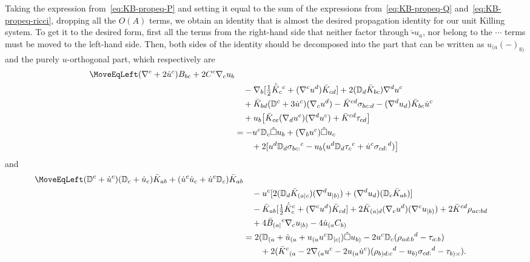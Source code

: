 \documentclass[a4paper]{article}
\theoremstyle{remark}
\newcommand{\D}{\mathbb{D}}
\begin{document}
Taking the expression from~\eqref{eq:KB-propeq-P} and setting it equal
to the sum of the expressions from~\eqref{eq:KB-propeq-Q}
and~\eqref{eq:KB-propeq-ricci}, dropping all the $O(A)$ terms, we obtain
an identity that is almost the desired propagation identity for our unit
Killing system. To get it to the desired form, first all the terms from
the right-hand side that neither factor through $\hat{\square} u_a$, nor
belong to the $\cdots$ terms must be moved to the left-hand side. Then,
both sides of the identity should be decomposed into the part that can
be written as $u_{(a} (-)_{b)}$ and the purely
$u$-orthogonal part, which respectively are
\begin{align}
	\notag
	\MoveEqLeft
	(\nabla^c + 2 \dot{u}^c) B_{bc}
		+ 2 C^c \nabla_c u_{b}
	\\ \notag & \quad {}
		- \nabla_{b} [\tfrac{1}{2} \dot{\bar{K}}_c{}^c + (\nabla^c u^d) \bar{K}_{cd}]
		+ 2(\D_d \bar{K}_{bc}) \nabla^d u^c
	\\ \notag & \quad {}
		+ \bar{K}_{bd} (\D^c + 3 \dot{u}^c) (\nabla_c u^d)
		- \bar{K}^{cd} \sigma_{bc:d}
		- (\nabla^d u_d)\bar{K}_{bc} \dot{u}^c
	\\ \notag & \quad {}
		+ u_{b} \big[\bar{K}_{ce}(\nabla_d u^e)(\nabla^d u^c) + \bar{K}^{cd} \tau_{cd}\big]
	\\
	\label{eq:B-propeq1}
	&= -u^c \D_c \hat{\square} u_{b}
		+ (\nabla_{b} u^c) \hat{\square} u_{c}
	\\ \notag & \qquad {}
		+2 [ u^d \D_d \sigma_{bc:}{}^c - u_b (u^d \D_d \tau_c{}^c + \dot{u}^c \sigma_{cd:}{}^d)  \big]
\end{align}
and
\begin{align}
	\notag
	\MoveEqLeft
	(\D^c + \dot{u}^c)(\D_c + \dot{u}_c)\bar{K}_{ab} + (\dot{u}^c\dot{u}_c + \dot{u}^c \D_c)\bar{K}_{ab}
	\\ \notag & \quad {}
		- u^c [2(\D_d \bar{K}_{(a|c})(\nabla^d u_{|b)}) + (\nabla^d u_d)(\D_c \bar{K}_{ab})]
	\\ \notag & \quad {}
		- \bar{K}_{ab} [\tfrac{1}{2} \dot{\bar{K}}_c^c + (\nabla^c u^d) \bar{K}_{cd}]
		+ 2 \bar{K}_{(a|d}(\nabla_c u^d)(\nabla^c u_{|b)})
		+ 2 \bar{K}^{cd} \rho_{ac:bd}
	\\ \notag & \quad {}
		+ 4 \bar{B}_{(a|}{}^c \nabla_c u_{|b)}
		- 4 \dot{u}_{(a} C_{b)}
	\\
	\label{eq:spK-propeq}
	&= 2 (\D_{(a} + \dot{u}_{(a} + u_{(a} u^c \D_{|c|}) \hat{\square} u_{b)} - 2 u^c \D_c(\rho_{ad:b}{}^d - \tau_{a:b})
	\\ \notag & \qquad {}
		+ 2 (\bar{K}^c{}_{(a} - 2\nabla_{(a} u^c - 2 u_{(a} \dot{u}^c)(\rho_{b)d:c}{}^d - u_{b)} \sigma_{cd:}{}^d - \tau_{b):c})
	.
\end{align}
\end{document}
